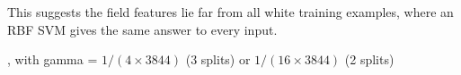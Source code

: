 
This suggests the field features lie far from all white training examples,
where an RBF SVM gives the same answer to every input.

, with gamma = $1/(4 \times 3844)$ (3 splits) or $1/(16 \times 3844)$ (2 splits)
